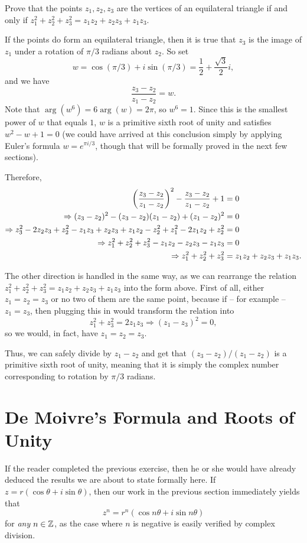 \begin{exercise}
	Prove that the points $z_1,z_2,z_3$ are the vertices of an equilateral triangle if and only if $z_1^2+z_2^2+z_3^2=z_1z_2+z_2z_3+z_1z_3$.
	
	\begin{sol}
		If the points do form an equilateral triangle, then it is true that $z_3$ is the image of $z_1$ under a rotation of $\pi/3$ radians about $z_2$. So set $$w=\cos(\pi/3)+i\sin(\pi/3)=\dfrac{1}{2}+\dfrac{\sqrt{3}}{2}i,$$ and we have $$\dfrac{z_3-z_2}{z_1-z_2}=w.$$ Note that $\arg(w^6)=6\arg(w)=2\pi$, so $w^6=1$. Since this is the smallest power of $w$ that equals $1$, $w$ is a primitive sixth root of unity and satisfies $w^2-w+1=0$ (we could have arrived at this conclusion simply by applying Euler's formula $w=e^{\pi i/3}$, though that will be formally proved in the next few sections).
		
		Therefore,
		\begin{align*}
			\left(\dfrac{z_3-z_2}{z_1-z_2}\right)^2-\dfrac{z_3-z_2}{z_1-z_2}+1 &=0 \\
			\Rightarrow (z_3-z_2)^2-(z_3-z_2)(z_1-z_2)+(z_1-z_2)^2 &=0 \\
			\Rightarrow z_3^2-2z_2z_3+z_2^2-z_1z_3+z_2z_3+z_1z_2-z_2^2+z_1^2-2z_1z_2+z_2^2 &=0 \\
			\Rightarrow z_1^2+z_2^2+z_3^2-z_1z_2-z_2z_3-z_1z_3 &=0 \\
			\Rightarrow z_1^2+z_2^2+z_3^2 &=z_1z_2+z_2z_3+z_1z_3.
		\end{align*}
		
		The other direction is handled in the same way, as we can rearrange the relation $z_1^2+z_2^2+z_3^2=z_1z_2+z_2z_3+z_1z_3$ into the form above. First of all, either $z_1=z_2=z_3$ or no two of them are the same point, because if -- for example -- $z_1=z_3$, then plugging this in would transform the relation into $$z_1^2+z_3^2=2z_1z_3 \Rightarrow (z_1-z_3)^2=0,$$ so we would, in fact, have $z_1=z_2=z_3$.
		
		Thus, we can safely divide by $z_1-z_2$ and get that $(z_3-z_2)/(z_1-z_2)$ is a primitive sixth root of unity, meaning that it is simply the complex number corresponding to rotation by $\pi/3$ radians. \qedsymbol
	\end{sol}
\end{exercise}

\section{De Moivre's Formula and Roots of Unity}
\label{sec:de-moivre}
If the reader completed the previous exercise, then he or she would have already deduced the results we are about to state formally here. If $z=r(\cos \theta+i\sin \theta)$, then our work in the previous section immediately yields that $$z^n=r^n(\cos n\theta+i\sin n\theta)$$ for \textit{any} $n \in \mathbb Z$, as the case where $n$ is negative is easily verified by complex division.

